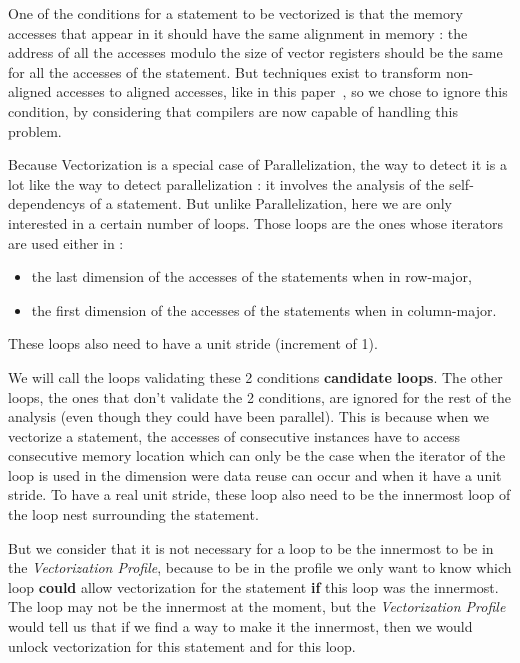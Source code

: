 \documentclass[paper=a4, fontsize=11.5pt]{scrartcl}
\numberwithin{equation}{section}        %
\numberwithin{figure}{section}          %
\numberwithin{table}{section}               %
\begin{document}
        One of the conditions for a statement to be vectorized is that the memory accesses
        that appear in it should have the same alignment in memory : the address of all the
        accesses modulo the size of vector registers should be the same for all the accesses
        of the statement.
        But techniques exist to transform non-aligned accesses to aligned accesses, like
        in this paper~\cite{Eichenberger:2004:VSA:996893.996853}, so we chose to ignore this
        condition, by considering that compilers are now capable of handling this problem.

\bigskip

        Because Vectorization is a special case of Parallelization, the way to detect it
        is a lot like the way to detect parallelization : it involves the analysis of
        the \glspl{self-dependency} of a statement. But unlike Parallelization, here we are
        only interested in a certain number of loops. Those loops are the ones whose iterators
        are used either in :
        \begin{itemize}
            \item the last dimension of the accesses of the statements when in row-major,
            \item the first dimension of the accesses of the statements when in column-major.
        \end{itemize}
        These loops also need to have a unit stride (increment of 1).

        We will call the loops validating these 2 conditions \textbf{candidate loops}.
        The other loops, the ones that don't validate the 2 conditions, are ignored for
        the rest of the analysis (even though they could have been parallel). This is
        because when we vectorize a statement, the accesses of consecutive instances have
        to access consecutive memory location which can only be the case when the iterator
        of the loop is used in the dimension were data reuse can occur and when it have a unit stride.
        To have a real unit stride, these loop also need to be the innermost loop of the loop nest
        surrounding the statement.
        
        But we consider that it is not necessary for a loop to be the innermost to be
        in the \textit{Vectorization Profile}, because to be in the profile
        we only want to know which loop \textbf{could} allow vectorization
        for the statement \textbf{if} this loop was the innermost. The loop may not be
        the innermost at the moment, but the \textit{Vectorization Profile} would tell
        us that if we find a way to make it the innermost, then we would unlock vectorization
        for this statement and for this loop.
\end{document}
